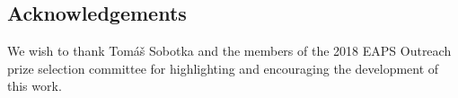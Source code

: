 \documentclass{article}
\newcommand\todo[1]{\textcolor{red}{[TODO: #1]}}
\begin{document}


\subsection*{Acknowledgements} We wish to thank Tom\'a\v{s} Sobotka and the members of the 2018 EAPS Outreach prize selection committee for highlighting and encouraging the development of this work.

\FloatBarrier

\pagebreak
\begin{appendix}

\end{appendix}


   
\end{document}
